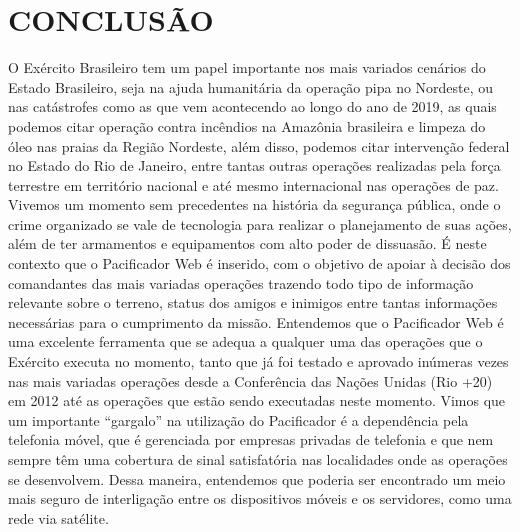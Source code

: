 % 
%


\chapter{CONCLUSÃO}
\label{chap:conclusao}

O Exército Brasileiro tem um papel importante nos mais variados cenários do Estado Brasileiro, seja na ajuda humanitária da operação pipa no Nordeste, ou nas catástrofes como as que vem acontecendo ao longo do ano de 2019, as quais podemos citar operação contra incêndios na Amazônia brasileira e limpeza do óleo nas praias da Região Nordeste, além disso, podemos citar intervenção federal no Estado do Rio de Janeiro, entre tantas outras operações realizadas pela força terrestre em território nacional e até mesmo internacional nas operações de paz.
Vivemos um momento sem precedentes na história da segurança pública, onde o crime organizado se vale de tecnologia para realizar o planejamento de suas ações, além de ter armamentos e equipamentos com alto poder de dissuasão. É neste contexto que o Pacificador Web é inserido, com o objetivo de apoiar à decisão dos comandantes das mais variadas operações trazendo todo tipo de informação relevante sobre o terreno, status dos amigos e inimigos entre tantas informações necessárias para o cumprimento da missão. 
Entendemos que o Pacificador Web é uma excelente ferramenta que se adequa a qualquer uma das operações que o Exército executa no momento, tanto que já foi testado e aprovado inúmeras vezes nas mais variadas operações desde a Conferência das Nações Unidas (Rio +20) em 2012 até as operações que estão sendo executadas neste momento.
Vimos que um importante “gargalo” na utilização do Pacificador é a dependência pela telefonia móvel, que é gerenciada por empresas privadas de telefonia e que nem sempre têm uma cobertura de sinal satisfatória nas localidades onde as operações se desenvolvem. Dessa maneira, entendemos que poderia ser encontrado um meio mais seguro de interligação entre os dispositivos móveis e os servidores, como uma rede via satélite.
